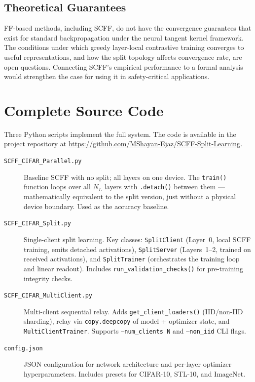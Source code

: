 \documentclass[12pt]{article}
\begin{document}
\subsection{Theoretical Guarantees}

FF-based methods, including SCFF, do not have the convergence guarantees that exist for
standard backpropagation under the neural tangent kernel framework. The conditions under which
greedy layer-local contrastive training converges to useful representations, and how the split
topology affects convergence rate, are open questions. Connecting SCFF's empirical performance
to a formal analysis would strengthen the case for using it in safety-critical applications.

\section{Complete Source Code}
\label{sec:code}

Three Python scripts implement the full system. The code is available in the project
repository at \url{https://github.com/MShayan-Ejaz/SCFF-Split-Learning}.

\begin{description}
  \item[\texttt{SCFF\_CIFAR\_Parallel.py}] Baseline SCFF with no split; all layers on one device.
        The \texttt{train()} function loops over all $N_L$ layers with \texttt{.detach()} between
        them --- mathematically equivalent to the split version, just without a physical device
        boundary. Used as the accuracy baseline.

  \item[\texttt{SCFF\_CIFAR\_Split.py}] Single-client split learning. Key classes:
        \texttt{SplitClient} (Layer~0, local SCFF training, emits detached activations),
        \texttt{SplitServer} (Layers~1--2, trained on received activations), and
        \texttt{SplitTrainer} (orchestrates the training loop and linear readout). Includes
        \texttt{run\_validation\_checks()} for pre-training integrity checks.

  \item[\texttt{SCFF\_CIFAR\_MultiClient.py}] Multi-client sequential relay. Adds
        \texttt{get\_client\_loaders()} (IID/non-IID sharding), relay via
        \texttt{copy.deepcopy} of model + optimizer state, and \texttt{MultiClientTrainer}.
        Supports \texttt{--num\_clients N} and \texttt{--non\_iid} CLI flags.

  \item[\texttt{config.json}] JSON configuration for network architecture and per-layer
        optimizer hyperparameters. Includes presets for CIFAR-10, STL-10, and ImageNet.
\end{description}
\end{document}
